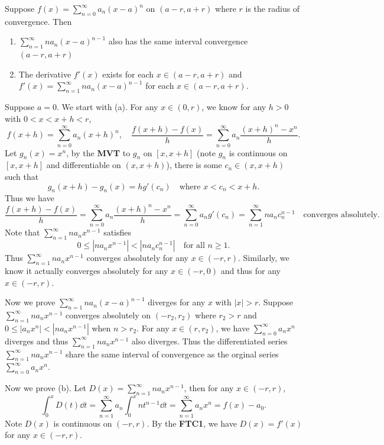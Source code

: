     \begin{theoremenv}\label{diff_power_series}
        Suppose $f(x) = \displaystyle \sum_{n=0}^\infty a_n (x-a)^n$ on $(a-r,a+r)$ where $r$ is the radius of convergence. Then 
        \begin{enumerate}[label=(\alph*)]
            \item $\displaystyle \sum_{n=1}^\infty n a_n (x-a)^{n-1}$ also has the same interval convergence $(a-r,a+r)$
            \item The derivative $f'(x) $ exists for each $x\in (a-r,a+r)$ and $f'(x) = \displaystyle \sum_{n=1}^\infty n a_n (x-a)^{n-1}$ for each $x\in (a-r,a+r)$.
        \end{enumerate}
    \end{theoremenv}
    \begin{proofenv}
        Suppose $a=0$. We start with (a). For any $x\in (0,r)$, we know for any $h>0$ with $0<x<x+h<r$,
        \[
        f(x+h) = \sum_{n=0}^\infty a_n (x+h)^n, \quad \frac{f(x+h)-f(x)}{h} = \sum_{n=0}^\infty a_n \frac{(x+h)^n - x^n}{h}.
        \]
        Let $g_n(x) = x^n$, by the \textbf{MVT} to $g_n$ on $[x,x+h]$ (note $g_n$ is continuous on $[x,x+h]$ and differentiable on $(x,x+h)$), there is some $c_n \in (x,x+h)$ such that
        \[
        g_n(x+h) - g_n(x) = h g'(c_n) \quad \text{where } x<c_n<x+h.
        \]
        Thus we have
        \[
        \frac{f(x+h)-f(x)}{h} = \sum_{n=0}^\infty a_n \frac{(x+h)^n - x^n}{h} = \sum_{n=0}^\infty a_n g'(c_n) = \sum_{n=1}^\infty n a_n c_n^{n-1}\quad \text{converges absolutely}.
        \]
        Note that $\displaystyle \sum_{n=1}^\infty n a_n x^{n-1}$ satisfies
        \[
        0 \le | n a_n x^{n-1}| < |n a_n c_n^{n-1}| \quad \text{for all } n\ge 1.
        \]
        Thus $\displaystyle \sum_{n=1}^\infty n a_n x^{n-1}$ converges absolutely for any $x\in (-r,r)$. Similarly, we know it actually converges absolutely for any $x\in (-r,0)$ and thus for any $x\in (-r,r)$.

        Now we prove $\displaystyle \sum_{n=1}^\infty n a_n (x-a)^{n-1}$ diverges for any $x$ with $|x| > r$. Suppose $\displaystyle \sum_{n=1}^\infty n a_n x^{n-1}$ converges absolutely on $(-r_2,r_2)$ where $r_2 > r$ and $0\le |a_n x^n| < |n a_n x^{n-1}|$ when $n>r_2$. For any $x\in (r,r_2)$, we have $\displaystyle \sum_{n=0}^\infty a_n x^n$ diverges and thus $\displaystyle \sum_{n=1}^\infty n a_n x^{n-1}$ also diverges. Thus the differentiated series $\displaystyle \sum_{n=1}^\infty n a_n x^{n-1}$ share the same interval of convergence as the orginal series $\displaystyle \sum_{n=0}^\infty a_n x^n$.

        Now we prove (b). Let $D(x) = \displaystyle \sum_{n=1}^\infty n a_n x^{n-1}$, then for any $x\in (-r,r)$,
        \[
        \int_0^x D(t) \dd t = \sum_{n=1}^{\infty} a_n \int_0^x n t^{n-1} \dd t = \sum_{n=1}^\infty a_n x^n = f(x)-a_0.
        \]
        Note $D(x)$ is continuous on $(-r,r)$. By the \textbf{FTC1}, we have $D(x) = f'(x)$ for any $x\in (-r,r)$.
    \end{proofenv}
